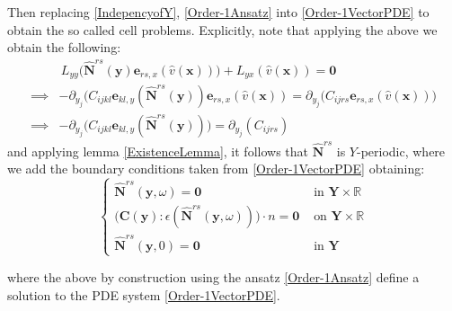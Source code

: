 Then replacing \ref{IndepencyofY}, \ref{Order-1Ansatz} into \ref{Order-1VectorPDE} to obtain the so called cell problems. Explicitly, note that applying the above we obtain the following:
\begin{align*}
    &\,L_{yy} \big( \hat{\mathbf{N}}^{rs} (\mathbf{y}) \mathbf{e}_{rs,x} (\hat{v}(\mathbf{x})) \big) + L_{yx}(\hat{v}(\mathbf{x}) ) = \mathbf{0} \\
    \implies& -\partial_{y_j} \big( C_{ijkl}\mathbf{e}_{kl,y}(\hat{\mathbf{N}}^{rs}(\mathbf{y}) ) \mathbf{e}_{rs,x}(\hat{v}(\mathbf{x})) = \partial_{y_j} \big( C_{ijrs}\mathbf{e}_{rs,x}(\hat{v}(\mathbf{x})) \big) \\
    \implies& - \partial_{y_j} \big( C_{ijkl} \mathbf{e}_{kl,y} (\hat{\mathbf{N}}^{rs}(\mathbf{y})) \big) = \partial_{y_j} (C_{ijrs})
\end{align*}
and applying lemma \ref{ExistenceLemma}, it follows that $\hat{\mathbf{N}}^{rs}$ is $Y$-periodic, where we add the boundary conditions taken from \ref{Order-1VectorPDE} obtaining:
\begin{equation*}
    \left \{
    \begin{array}{cc}
        \hat{\mathbf{N}}^{rs}(\mathbf{y}, \omega) = \mathbf{0} & \text{ in } \mathbf{Y} \times \mathbb{R} \\
        \big( \mathbf{C}(\mathbf{y}) : \epsilon(\hat{\mathbf{N}}^{rs}(\mathbf{y}, \omega)) \big) \cdot n = \mathbf{0} & \text{ on } \mathbf{Y}\times \mathbb{R}  \\
        \hat{\mathbf{N}}^{rs} (\mathbf{y},0) = \mathbf{0} &  \text{ in } \mathbf{Y}
    \end{array}
    \right.
\end{equation*}

where the above by construction using the ansatz \ref{Order-1Ansatz} define a solution to the PDE system \ref{Order-1VectorPDE}.


